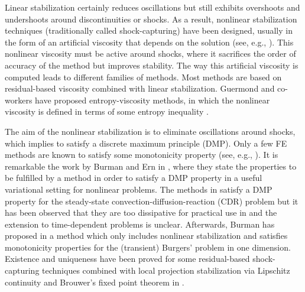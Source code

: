 Linear stabilization certainly reduces oscillations but still exhibits overshoots and undershoots around discontinuities or shocks. As a result, nonlinear stabilization techniques (traditionally called shock-capturing) have been designed, usually in the form of an artificial viscosity that depends on the solution (see, e.g., \cite{johnson_convergence_1987,johnson_convergence_1990,szepessy_convergence_1989}). This nonlinear viscosity must be active around shocks, where it sacrifices the order of accuracy of the method but improves stability. The way this artificial viscosity is computed leads to different families of methods. Most methods are based on residual-based viscosity \cite{codina_stabilization_2000,lube_residual-based_2006,john_spurious_2007,john_spurious_2008} combined with linear stabilization. Guermond and co-workers have proposed entropy-viscosity methods, %
 in which the nonlinear viscosity is defined in terms of some entropy inequality \cite{guermond_entropy_2011}. %

The aim of the nonlinear stabilization is to eliminate oscillations around shocks, which implies to satisfy a discrete maximum principle (DMP). Only a few FE methods are known to satisfy some monotonicity property (see, e.g., \cite{mizukami_petrov-galerkin_1985,burman_nonlinear_2002,burman_stabilized_2005}). It is remarkable the work by Burman and Ern in \cite{burman_nonlinear_2002}, where they state the properties to be fulfilled by a method in order to satisfy a DMP property in a useful variational setting for nonlinear problems. The methods in \cite{burman_stabilized_2005,burman_edge_2004} satisfy a DMP property for the steady-state convection-diffusion-reaction (CDR) problem but it has been observed that they are too dissipative for practical use in \cite{john_spurious_2008} and the extension to time-dependent problems is unclear. Afterwards, Burman has proposed in \cite{burman_nonlinear_2007} a method which only includes nonlinear stabilization and satisfies monotonicity properties for the (transient) Burgers' problem in one dimension. %
Existence and uniqueness have been proved for some residual-based shock-capturing techniques combined with local
projection stabilization via Lipschitz continuity and Brouwer's fixed point theorem in \cite{barrenechea_local_2013}.

